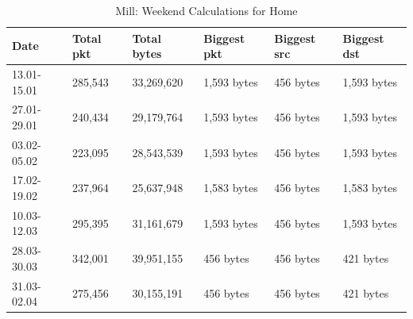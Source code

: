 \begin{table}[H]
    \caption{Mill: Weekend Calculations for Home}
    \begin{tabular}{|l|l|l|l|l|l|}
        \hline
        \textbf{Date}    & \textbf{Total pkt} & \textbf{Total bytes} & \textbf{Biggest pkt} & \textbf{Biggest src} & \textbf{Biggest dst} \\ \hline
        13.01-15.01      & 285,543            & 33,269,620           & 1,593 bytes          & 456 bytes            & 1,593 bytes          \\ \hline
        27.01-29.01      & 240,434            & 29,179,764           & 1,593 bytes          & 456 bytes            & 1,593 bytes          \\ \hline
        03.02-05.02      & 223,095            & 28,543,539           & 1,593 bytes          & 456 bytes            & 1,593 bytes          \\ \hline
        17.02-19.02      & 237,964            & 25,637,948           & 1,583 bytes          & 456 bytes            & 1,583 bytes          \\ \hline
        10.03-12.03      & 295,395            & 31,161,679           & 1,593 bytes          & 456 bytes            & 1,593 bytes          \\ \hline
        28.03-30.03      & 342,001            & 39,951,155           & 456 bytes            & 456 bytes            & 421 bytes            \\ \hline
        31.03-02.04      & 275,456            & 30,155,191           & 456 bytes            & 456 bytes            & 421 bytes            \\ \hline
    \end{tabular}
    \label{tab:MillHomeWeekends}
\end{table}

